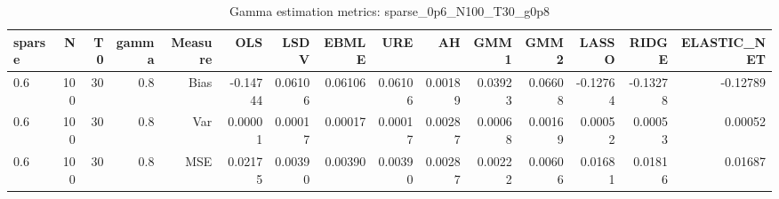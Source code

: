 \begin{table}[!htbp]\centering
\caption{Gamma estimation metrics: sparse_0p6_N100_T30_g0p8}
\label{tab:table1_sparse_0p6_N100_T30_g0p8}
\begin{tabular}{lrrrrrrrrrrrrrr}
\hline
sparse & N & T0 & gamma & Measure & OLS & LSDV & EBMLE & URE & AH & GMM1 & GMM2 & LASSO & RIDGE & ELASTIC_NET \\
\hline
0.6 & 100 & 30 & 0.8 & Bias & -0.14744 & 0.06106 & 0.06106 & 0.06106 & 0.00189 & 0.03923 & 0.06608 & -0.12764 & -0.13278 & -0.12789 \\
0.6 & 100 & 30 & 0.8 & Var & 0.00001 & 0.00017 & 0.00017 & 0.00017 & 0.00287 & 0.00068 & 0.00169 & 0.00052 & 0.00053 & 0.00052 \\
0.6 & 100 & 30 & 0.8 & MSE & 0.02175 & 0.00390 & 0.00390 & 0.00390 & 0.00287 & 0.00222 & 0.00606 & 0.01681 & 0.01816 & 0.01687 \\
\hline
\end{tabular}
\end{table}

